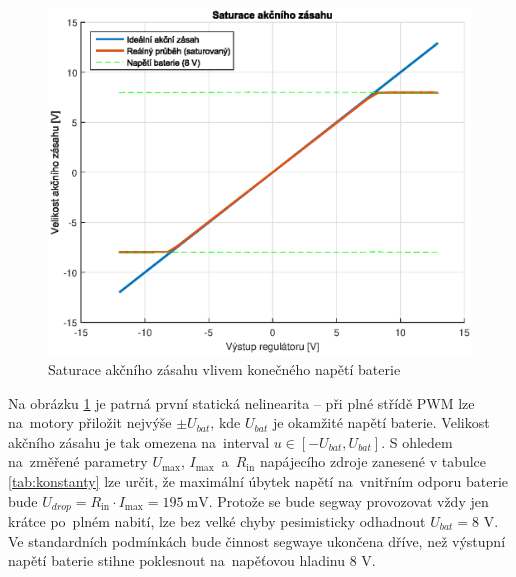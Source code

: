\documentclass[conference]{IEEEtran}
\begin{document}
\begin{figure}[htbp]
    \centerline{\includegraphics[width=\linewidth]{pwm_saturace.eps}}
    \caption{Saturace akčního zásahu vlivem konečného napětí baterie}
    \label{fig:pwm_saturace}        
\end{figure}

Na obrázku \ref{fig:pwm_saturace} je patrná první statická nelinearita -- při plné střídě PWM lze na~motory přiložit nejvýše $\pm U_{bat}$,
kde $U_{bat}$ je okamžité napětí baterie. Velikost akčního zásahu je tak omezena na~interval $u \in [-U_{bat}, U_{bat}]$.
S ohledem na~změřené parametry $U_\text{max}$, $I_\text{max}$~a~$R_\text{in}$ napájecího zdroje zanesené v tabulce \ref{tab:konstanty} lze určit,
že maximální úbytek napětí na~vnitřním odporu baterie bude $U_{drop} = R_\text{in} \cdot I_\text{max} = 195~\si{\milli\volt}$.
Protože se bude segway provozovat vždy jen krátce po~plném nabití, lze bez velké chyby pesimisticky odhadnout $U_{bat} = 8$ \si{V}.
Ve standardních podmínkách bude činnost segwaye ukončena dříve, než výstupní napětí baterie stihne poklesnout na~napěťovou hladinu 8 \si{V}.
\end{document}
